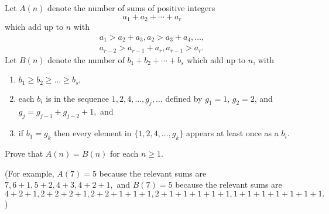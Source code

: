 Let $A(n)$ denote the number of sums of positive integers
\[
a_1 + a_2 + \cdots + a_r
\]
which add up to $n$ with
\begin{gather*}
a_1 > a_2 + a_3, a_2 > a_3 + a_4, \ldots, \\
a_{r-2} > a_{r-1} + a_r, a_{r-1}  > a_r.
\end{gather*}
Let $B(n)$ denote the number of $b_1 + b_2 + \cdots + b_s$ which add up
to $n$, with
\begin{enumerate}
    \item $b_1 \geq b_2 \geq \dots \geq b_s,$
    \item each $b_i$ is in the sequence $1, 2, 4, \dots, g_j, \dots$
    defined by $g_1 = 1$, $g_2 = 2$, and $g_j = g_{j-1} + g_{j-2} + 1,$ and
    \item if $b_1 = g_k$ then every element in $\{1, 2, 4, \dots, g_k\}$
    appears at least once as a $b_i$.
\end{enumerate}
Prove that $A(n) = B(n)$ for each $n \geq 1$.

(For example, $A(7) = 5$ because the relevant sums are $7, 6+1, 5+2, 4+3,
4+2+1,$ and $B(7) = 5$ because the relevant sums are $4+2+1, 2+2+2+1,
2+2+1+1+1, 2+1+1+1+1+1, 1+1+1+1+1+1+1.$)

